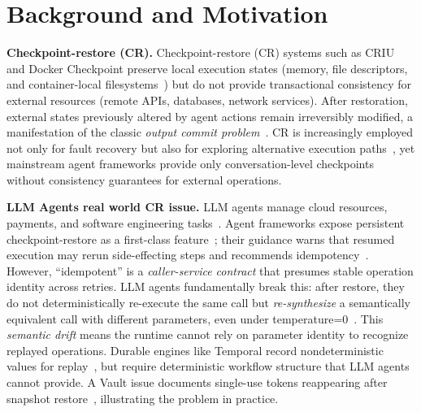 \documentclass[sigplan,nonacm]{acmart}
\begin{document}


\maketitle

\section{Background and Motivation}

\textbf{Checkpoint-restore (CR).} Checkpoint-restore (CR) systems such as CRIU and Docker Checkpoint preserve local execution states (memory, file descriptors, and container-local filesystems~\cite{criu,mvvm}) but do not provide transactional consistency for external resources (remote APIs, databases, network services). After restoration, external states previously altered by agent actions remain irreversibly modified, a manifestation of the classic \textit{output commit problem}~\cite{elnozahy2002survey, strom1985optimistic}. CR is increasingly employed not only for fault recovery but also for exploring alternative execution paths~\cite{xu2025agenticexploration}, yet mainstream agent frameworks provide only conversation-level checkpoints without consistency guarantees for external operations.

\textbf{LLM Agents real world CR issue.} LLM agents manage cloud resources, payments, and software engineering tasks~\cite{sweagent, openhands}. Agent frameworks expose persistent checkpoint-restore as a first-class feature~\cite{langgraph, langgraph_durable}; their guidance warns that resumed execution may rerun side-effecting steps and recommends idempotency~\cite{langgraph_functional_idempotency}. However, ``idempotent'' is a \emph{caller-service contract} that presumes stable operation identity across retries. LLM agents fundamentally break this: after restore, they do not deterministically re-execute the same call but \emph{re-synthesize} a semantically equivalent call with different parameters, even under temperature=0~\cite{atil2025nondeterminism, khatchadourian2026replayable}. This \emph{semantic drift} means the runtime cannot rely on parameter identity to recognize replayed operations. Durable engines like Temporal record nondeterministic values for replay~\cite{temporal_side_effects}, but require deterministic workflow structure that LLM agents cannot provide.  A Vault issue documents single-use tokens reappearing after snapshot restore~\cite{vault_issue_28378}, illustrating the problem in practice. 
\end{document}

